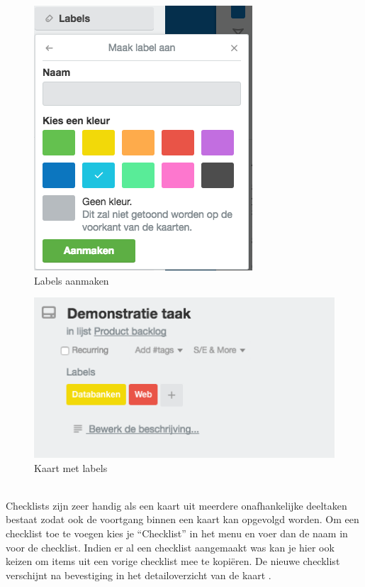 \begin{figure}[H]
	\centering
	\includegraphics[scale=0.6]{./afbeeldingen/maak_label_aan.png}
	\caption{Labels aanmaken}
	\label{fig:maak_label_aan}	
\end{figure} 

\begin{figure}[H]
	\centering
	\includegraphics[scale=0.5]{./afbeeldingen/detail_kaart_labels.png}
	\caption{Kaart met labels}
	\label{fig:detail_kaart_labels}	
\end{figure} 

\noindent
\\
Checklists zijn zeer handig als een kaart uit meerdere onafhankelijke deeltaken bestaat zodat ook de voortgang binnen een kaart kan opgevolgd worden. Om een checklist toe te voegen kies je ``Checklist'' in het menu en voer dan de naam in voor de checklist. Indien er al een checklist aangemaakt was kan je hier ook keizen om items uit een vorige checklist mee te kopi\"eren. De nieuwe checklist verschijnt na bevestiging in het detailoverzicht van de kaart .

